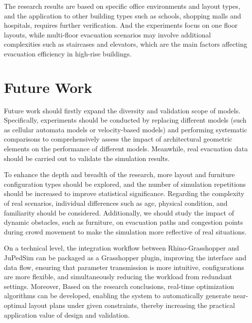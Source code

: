 The research results are based on specific office environments and layout types, and the application to other building types such as schools, shopping malls and hospitals, requires further verification. And the experiments focus on one floor layouts, while multi-floor evacuation scenarios may involve additional complexities such as staircases and elevators, which are the main factors affecting evacuation efficiency in high-rise buildings.

\section{Future Work}
Future work should firstly expand the diversity and validation scope of models. Specifically, experiments should be conducted by replacing different models (such as cellular automata models or velocity-based models) and performing systematic comparisons to comprehensively assess the impact of architectural geometric elements on the performance of different models. Meanwhile, real evacuation data should be carried out to validate the simulation results.

To enhance the depth and breadth of the research, more layout and furniture configuration types should be explored, and the number of simulation repetitions should be increased to improve statistical significance. Regarding the complexity of real scenarios, individual differences such as age, physical condition, and familiarity should be considered.  Additionally, we should study the impact of dynamic obstacles, such as furniture, on evacuation paths and congestion points during crowd movement to make the simulation more reflective of real situations.

On a technical level, the integration workflow between Rhino-Grasshopper and JuPedSim can be  packaged as a Grasshopper plugin, improving the interface and data flow, ensuring that parameter transmission is more intuitive, configurations are more flexible, and simultaneously reducing the workload from redundant settings. Moreover, Based on the research conclusions, real-time optimization algorithms can be developed, enabling the system to automatically generate near-optimal layout plans under given constraints, thereby increasing the practical application value of design and validation.